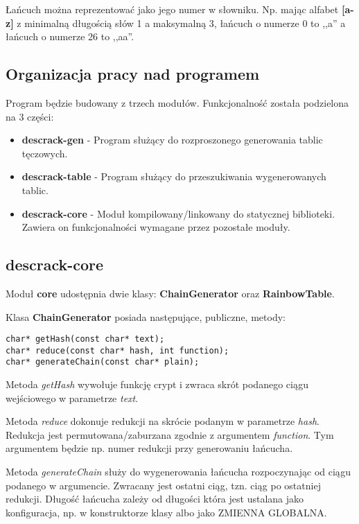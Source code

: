 \documentclass[a4paper,11pt]{article}
\begin{document}
Łańcuch można reprezentować jako jego numer w słowniku. Np. mając alfabet \textbf{[a-z]} z minimalną długością słów 1 a maksymalną 3, łańcuch o numerze 0 to ,,a'' a łańcuch o numerze 26 to ,,aa''.

\subsection{Organizacja pracy nad programem}

Program będzie budowany z trzech modułów. Funkcjonalność została podzielona na 3 części:
\begin{itemize}
	\item \textbf{descrack-gen} - Program służący do rozproszonego generowania tablic tęczowych.
	\item \textbf{descrack-table} - Program służący do przeszukiwania wygenerowanych tablic.
	\item \textbf{descrack-core} - Moduł kompilowany/linkowany do statycznej biblioteki. Zawiera on funkcjonalności wymagane przez pozostałe moduły.
\end{itemize}

\subsection{descrack-core}

Moduł \textbf{core} udostępnia dwie klasy: \textbf{ChainGenerator} oraz \textbf{RainbowTable}. 

Klasa \textbf{ChainGenerator} posiada następujące, publiczne, metody:
\begin{lstlisting}
char* getHash(const char* text);
char* reduce(const char* hash, int function);
char* generateChain(const char* plain);
\end{lstlisting}

Metoda \emph{getHash} wywołuje funkcję crypt i zwraca skrót podanego ciągu wejściowego w parametrze \emph{text}.

Metoda \emph{reduce} dokonuje redukcji na skrócie podanym w parametrze \emph{hash}. Redukcja jest permutowana/zaburzana zgodnie z argumentem \emph{function}. Tym argumentem będzie np. numer redukcji przy generowaniu łańcucha.

Metoda \emph{generateChain} służy do wygenerowania łańcucha rozpoczynając od ciągu podanego w argumencie. Zwracany jest ostatni ciąg, tzn. ciąg po ostatniej redukcji. Długość łańcucha zależy od długości która jest ustalana jako konfiguracja, np. w konstruktorze klasy albo jako ZMIENNA GLOBALNA.
\end{document}
